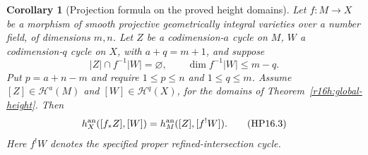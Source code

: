 \documentclass[11pt,a4paper]{article}
\newtheorem{corollary}[theorem]{Corollary}
\theoremstyle{definition}
\theoremstyle{remark}
\numberwithin{equation}{section}
\begin{document}
\begin{corollary}[Projection formula on the proved height domains]
\label{r16hp:height-projection}
Let $f:M\to X$ be a morphism of smooth projective geometrically
integral varieties over a number field, of dimensions $m,n$.
Let $Z$ be a codimension-$a$ cycle on $M$, $W$ a codimension-$q$
cycle on $X$, with $a+q=m+1$, and suppose
\[
 |Z|\cap f^{-1}|W|=\varnothing,\qquad
 \dim f^{-1}|W|\leq m-q.
\]
Put $p=a+n-m$ and require $1\leq p\leq n$ and $1\leq q\leq m$.
Assume $[Z]\in\mathcal H^a(M)$ and $[W]\in\mathcal H^q(X)$,
for the domains of Theorem~\ref{r16h:global-height}. Then
\[
             h_X^{\rm an}([f_*Z],[W])
                       =h_M^{\rm an}([Z],[f^!W]).
 \tag{HP16.3}\label{r16hp:height-projection-eq}
\]
Here $f^!W$ denotes the specified proper refined-intersection cycle.
\end{corollary}
\end{document}
